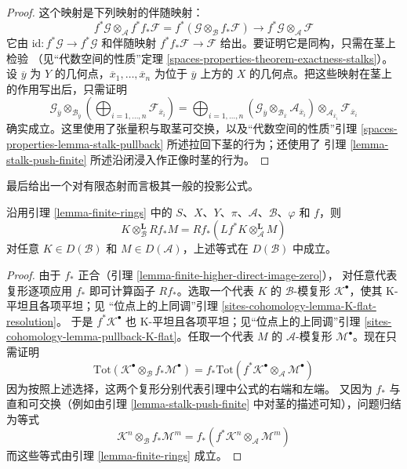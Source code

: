 \begin{proof}
这个映射是下列映射的伴随映射：
$$
f^*\mathcal{G} \otimes_\mathcal{A}
f^* f_*\mathcal{F} =
f^*(\mathcal{G} \otimes_\mathcal{B} f_*\mathcal{F})
\longrightarrow
f^*\mathcal{G} \otimes_\mathcal{A} \mathcal{F}
$$
它由 $\text{id} : f^*\mathcal{G} \to f^*\mathcal{G}$ 和伴随映射
$f^* f_*\mathcal{F} \to \mathcal{F}$ 给出。要证明它是同构，只需在茎上检验
（见“代数空间的性质”定理
\ref{spaces-properties-theorem-exactness-stalks}）。设 $\overline{y}$ 为 $Y$
的几何点，$\overline{x}_1, \ldots, \overline{x}_n$ 为位于
$\overline{y}$ 上方的 $X$ 的几何点。把这些映射在茎上的作用写出后，只需证明
$$
\mathcal{G}_{\overline{y}}
\otimes_{\mathcal{B}_{\overline{y}}}
\left(
\bigoplus\nolimits_{i = 1, \ldots, n} \mathcal{F}_{\overline{x}_i}
\right) =
\bigoplus\nolimits_{i = 1, \ldots, n}
(\mathcal{G}_{\overline{y}}
\otimes_{\mathcal{B}_{\overline{x}}}
\mathcal{A}_{\overline{x}_i}) \otimes_{\mathcal{A}_{\overline{x}_i}}
\mathcal{F}_{\overline{x}_i}
$$
确实成立。这里使用了张量积与取茎可交换，以及“代数空间的性质”引理
\ref{spaces-properties-lemma-stalk-pullback} 所述拉回下茎的行为；还使用了
引理 \ref{lemma-stalk-push-finite} 所述沿闭浸入作正像时茎的行为。
\end{proof}

\noindent
最后给出一个对有限态射而言极其一般的投影公式。

\begin{lemma}
\label{lemma-projection-formula-finite}
沿用引理 \ref{lemma-finite-rings} 中的
$S$、$X$、$Y$、$\pi$、$\mathcal{A}$、$\mathcal{B}$、$\varphi$ 和 $f$，则
$$
K \otimes_\mathcal{B}^\mathbf{L} Rf_*M =
Rf_*(Lf^*K \otimes_\mathcal{A}^\mathbf{L} M)
$$
对任意 $K \in D(\mathcal{B})$ 和 $M \in D(\mathcal{A})$，上述等式在
$D(\mathcal{B})$ 中成立。
\end{lemma}

\begin{proof}
由于 $f_*$ 正合（引理 \ref{lemma-finite-higher-direct-image-zero}），
对任意代表复形逐项应用 $f_*$ 即可计算函子 $Rf_*$。选取一个代表 $K$ 的
$\mathcal{B}$-模复形 $\mathcal{K}^\bullet$，使其 K-平坦且各项平坦；见
“位点上的上同调”引理 \ref{sites-cohomology-lemma-K-flat-resolution}。
于是 $f^*\mathcal{K}^\bullet$ 也 K-平坦且各项平坦；见“位点上的上同调”引理
\ref{sites-cohomology-lemma-pullback-K-flat}。任取一个代表 $M$ 的
$\mathcal{A}$-模复形 $\mathcal{M}^\bullet$。现在只需证明
$$
\text{Tot}(\mathcal{K}^\bullet \otimes_\mathcal{B} f_*\mathcal{M}^\bullet)
=
f_*\text{Tot}(f^*\mathcal{K}^\bullet \otimes_\mathcal{A} \mathcal{M}^\bullet)
$$
因为按照上述选择，这两个复形分别代表引理中公式的右端和左端。
又因为 $f_*$ 与直和可交换（例如由引理
\ref{lemma-stalk-push-finite} 中对茎的描述可知），问题归结为等式
$$
\mathcal{K}^n \otimes_\mathcal{B} f_*\mathcal{M}^m
=
f_*(f^*\mathcal{K}^n \otimes_\mathcal{A} \mathcal{M}^m)
$$
而这些等式由引理 \ref{lemma-finite-rings} 成立。
\end{proof}









